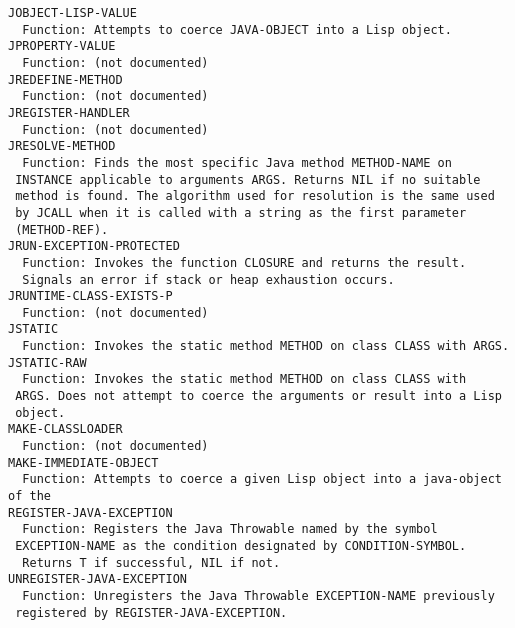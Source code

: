 \begin{verbatim}
JOBJECT-LISP-VALUE
  Function: Attempts to coerce JAVA-OBJECT into a Lisp object.
JPROPERTY-VALUE
  Function: (not documented)
JREDEFINE-METHOD
  Function: (not documented)
JREGISTER-HANDLER
  Function: (not documented)
JRESOLVE-METHOD
  Function: Finds the most specific Java method METHOD-NAME on
 INSTANCE applicable to arguments ARGS. Returns NIL if no suitable
 method is found. The algorithm used for resolution is the same used
 by JCALL when it is called with a string as the first parameter
 (METHOD-REF).
JRUN-EXCEPTION-PROTECTED
  Function: Invokes the function CLOSURE and returns the result.
  Signals an error if stack or heap exhaustion occurs.
JRUNTIME-CLASS-EXISTS-P
  Function: (not documented)
JSTATIC
  Function: Invokes the static method METHOD on class CLASS with ARGS.
JSTATIC-RAW
  Function: Invokes the static method METHOD on class CLASS with
 ARGS. Does not attempt to coerce the arguments or result into a Lisp
 object.
MAKE-CLASSLOADER
  Function: (not documented)
MAKE-IMMEDIATE-OBJECT
  Function: Attempts to coerce a given Lisp object into a java-object of the
REGISTER-JAVA-EXCEPTION
  Function: Registers the Java Throwable named by the symbol
 EXCEPTION-NAME as the condition designated by CONDITION-SYMBOL.
  Returns T if successful, NIL if not.
UNREGISTER-JAVA-EXCEPTION
  Function: Unregisters the Java Throwable EXCEPTION-NAME previously
 registered by REGISTER-JAVA-EXCEPTION.
\end{verbatim}
